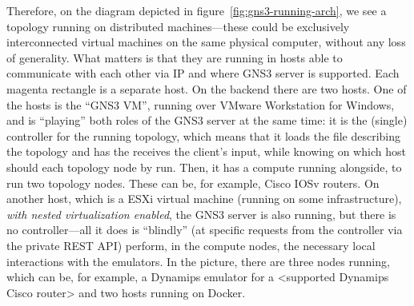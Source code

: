 Therefore, on the diagram depicted in figure~\ref{fig:gns3-running-arch}, we see a topology running on distributed machines---these could be exclusively interconnected virtual machines on the same physical computer, without any loss of generality. %
What matters is that they are running in hosts able to communicate with each other via IP and where GNS3 server is supported.
Each magenta rectangle is a separate host. %
On the backend there are two hosts.
One of the hosts is the ``GNS3 VM'', running over VMware Workstation for Windows, and is ``playing'' both roles of the GNS3 server at the same time: it is the (single) controller for the running topology, which means that it loads the file describing the topology and has the receives the client's input, while knowing on which host should each topology node by run.
Then, it has a compute running alongside, to run two topology nodes.
These can be, for example, Cisco IOSv routers. %
On another host, which is a ESXi virtual machine (running on some infrastructure), \emph{with nested virtualization enabled}, the GNS3 server is also running, but there is no controller---all it does is ``blindly'' (at specific requests from the controller via the private REST API) perform, in the compute nodes, the necessary local interactions with the emulators. %
In the picture, there are three nodes running, which can be, for example, a Dynamips emulator for a <supported Dynamips Cisco router> and two hosts running on Docker. %

